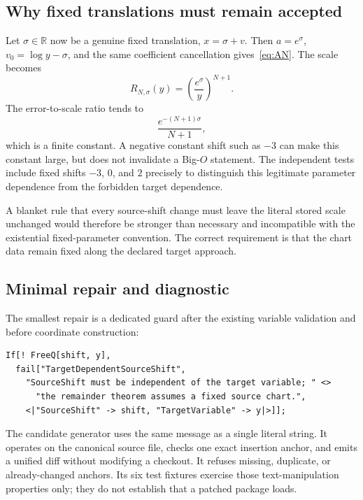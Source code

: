 \documentclass[11pt,letterpaper]{article}
\newcommand{\RR}{\mathbb R}
\begin{document}
\subsection{Why fixed translations must remain accepted}
Let $\sigma\in\RR$ now be a genuine fixed translation, $x=\sigma+v$. Then $a=e^\sigma$, $v_0=\log y-\sigma$, and the same coefficient cancellation gives~\eqref{eq:AN}. The scale becomes
\[
 R_{N,\sigma}(y)=\left(\frac{e^\sigma}{y}\right)^{N+1}.
\]
The error-to-scale ratio tends to
\begin{equation}
 \frac{e^{-(N+1)\sigma}}{N+1},
 \label{eq:fixed-limit}
\end{equation}
which is a finite constant. A negative constant shift such as $-3$ can make this constant large, but does not invalidate a Big-$O$ statement. The independent tests include fixed shifts $-3$, $0$, and $2$ precisely to distinguish this legitimate parameter dependence from the forbidden target dependence.

A blanket rule that every source-shift change must leave the literal stored scale unchanged would therefore be stronger than necessary and incompatible with the existential fixed-parameter convention. The correct requirement is that the chart data remain fixed along the declared target approach.

\subsection{Minimal repair and diagnostic}
The smallest repair is a dedicated guard after the existing variable validation and before coordinate construction:
\par\noindent\begin{minipage}{\linewidth}
\begin{lstlisting}
If[! FreeQ[shift, y],
  fail["TargetDependentSourceShift",
    "SourceShift must be independent of the target variable; " <>
      "the remainder theorem assumes a fixed source chart.",
    <|"SourceShift" -> shift, "TargetVariable" -> y|>]];
\end{lstlisting}
\end{minipage}\par
The candidate generator uses the same message as a single literal string. It operates on the canonical source file, checks one exact insertion anchor, and emits a unified diff without modifying a checkout. It refuses missing, duplicate, or already-changed anchors. Its six test fixtures exercise those text-manipulation properties only; they do not establish that a patched package loads.
\end{document}

